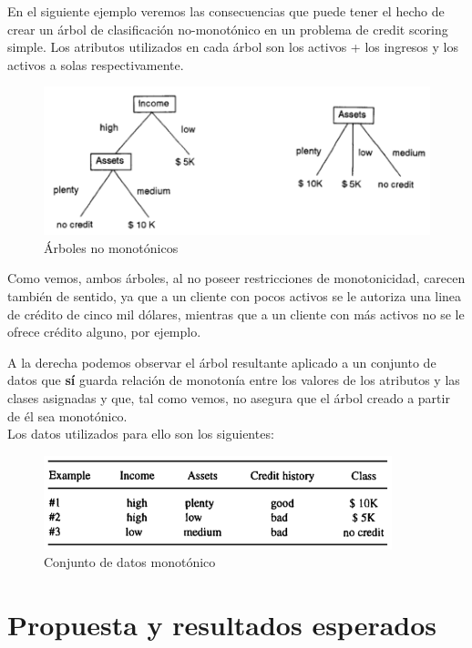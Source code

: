 En el siguiente ejemplo veremos las consecuencias que puede tener el hecho de crear un árbol de clasificación no-monotónico en un problema de credit scoring simple. Los atributos utilizados en cada árbol son los activos + los ingresos y los activos a solas respectivamente. 


\begin{figure}[H]
	\centering
	\includegraphics[width=1\textwidth]{imagenes/ejAr} 
	\caption{Árboles no monotónicos\cite{ref14}}
\end{figure}

Como vemos, ambos árboles, al no poseer restricciones de monotonicidad, carecen también de sentido, ya que a un cliente con pocos activos se le autoriza una linea de crédito de cinco mil dólares, mientras que a un cliente con más activos no se le ofrece crédito alguno, por ejemplo.

A la derecha podemos observar el árbol resultante aplicado a un conjunto de datos que \textbf{sí} guarda relación de monotonía entre los valores de los atributos y las clases asignadas y que, tal como vemos, no asegura que el árbol creado a partir de él sea monotónico.\\
Los datos utilizados para ello son los siguientes:

\begin{figure}[H]
	\centering
	\includegraphics[width=0.9\textwidth]{imagenes/tablaEj} 
	\caption{Conjunto de datos monotónico\cite{ref14}}
\end{figure}

\section{Propuesta y resultados esperados}

